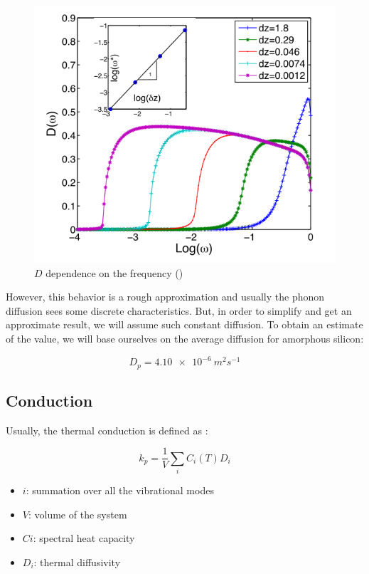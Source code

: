 \begin{figure}[!h]
    \centering
    \includegraphics*[width=.5\paperwidth]{figures/4_thermal/plateau.png}
    \caption{$D$ dependence on the frequency (\cite{phonon_plateau}) \label{fig:4_1}}
\end{figure}

However, this behavior is a rough approximation and usually the phonon diffusion sees some discrete characteristics. But, in order to simplify and get an approximate result, we will assume such constant diffusion. To obtain an estimate of the value, we will base ourselves on the average diffusion for amorphous silicon:

\begin{equation}
    D_p = \SI{4.10e-6}{m^2 s^{-1}}
    \label{eq:4_2}
\end{equation}

\subsection{Conduction}

Usually, the thermal conduction is defined as \cite{phonon_physics}:

\begin{equation}
    k_p = \frac{1}{V} \sum_i C_i(T)D_i
    \label{eq:4_3}
\end{equation}

\begin{itemize}
    \item $i$: summation over all the vibrational modes
    \item $V$: volume of the system
    \item $Ci$: spectral heat capacity
    \item $D_i$: thermal diffusivity
\end{itemize}

